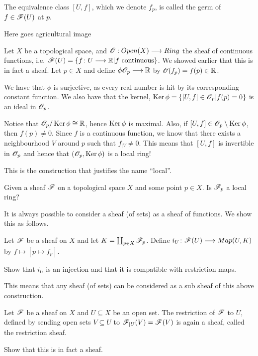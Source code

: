 The equivalence class $[U, f]$, which we denote $f_p$, is called the germ of $f\in \mathscr{F}(U)$ at $p$. 

Here goes agricultural image

\begin{example}
Let $X$ be a topological space, and $\mathscr{O}:Open(X)\longrightarrow Ring$ the sheaf of continuous functions, i.e. $\mathscr{F}(U) = \{ f\colon U\longrightarrow \mathbb{R} \vert f \text{ continuous}\}$. We showed earlier that this is in fact a sheaf. Let $p\in X$ and define $\phi \mathscr{O}_p\longrightarrow \mathbb{R}$ by $\mathscr{O}(f_p)=f(p)\in \mathbb{R}$. 

We have that $\phi$ is surjective, as every real number is hit by its corresponding constant function. We also have that the kernel, $\operatorname{Ker}\phi = \{ [U, f]\in \mathscr{O}_p \vert f(p)=0\}$ is an ideal in $\mathscr{O}_p$. 

Notice that $\mathscr{O}_p / \operatorname{Ker}\phi \cong \mathbb{R}$, hence $\operatorname{Ker}\phi$ is maximal. Also, if $[U, f]\in \mathscr{O}_p \setminus \operatorname{Ker}\phi$, then $f(p)\neq 0$. Since $f$ is a continuous function, we know that there exists a neighbourhood $V$ around $p$ such that $f_{\vert V}\neq 0$. This means that $[U, f]$ is invertible in $\mathscr{O}_p$ and hence that $(\mathscr{O}_p, \operatorname{Ker}\phi)$ is a local ring! 

This is the construction that justifies the name ``local''. 
\end{example}


\begin{problem}
Given a sheaf $\mathscr{F}$ on a topological space $X$ and some point $p\in X$. Is $\mathscr{F}_p$ a local ring?  
\end{problem}

It is always possible to consider a sheaf (of sets) as a sheaf of functions. We show this as follows. 

Let $\mathscr{F}$ be a sheaf on $X$ and let $K=\coprod_{p\in X}\mathscr{F}_p$. Define $i_U\colon\mathscr{F}(U)\longrightarrow Map(U, K)$ by $f\mapsto[p\mapsto f_p]$. 

\begin{problem}
Show that $i_U$ is an injection and that it is compatible with restriction maps. 
\end{problem}

This means that any sheaf (of sets) can be considered as a sub sheaf of this above construction. 

\begin{example}
Let $\mathscr{F}$ be a sheaf on $X$ and $U\subseteq X$ be an open set. The restriction of $\mathscr{F}$ to $U$, defined by sending open sets $V\subseteq U$ to $\mathscr{F}_{\vert U}(V) = \mathscr{F}(V)$ is again a sheaf, called the restriction sheaf. 
\end{example}
\begin{problem}
Show that this is in fact a sheaf.
\end{problem}

